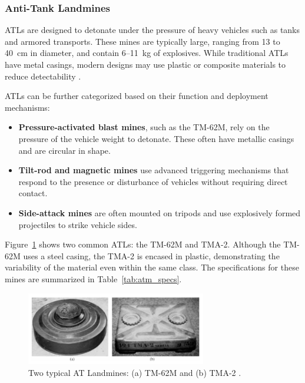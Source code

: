 \subsubsection{Anti-Tank Landmines}

ATLs are designed to detonate under the pressure of heavy vehicles such as tanks and armored transports. These mines are typically large, ranging from 13 to 40~cm in diameter, and contain 6–11~kg of explosives. While traditional ATLs have metal casings, modern designs may use plastic or composite materials to reduce detectability \cite{evans2024detection}.

ATLs can be further categorized based on their function and deployment mechanisms:
\begin{itemize}
    \item \textbf{Pressure-activated blast mines}, such as the TM-62M, rely on the pressure of the vehicle weight to detonate. These often have metallic casings and are circular in shape.
    \item \textbf{Tilt-rod and magnetic mines} use advanced triggering mechanisms that respond to the presence or disturbance of vehicles without requiring direct contact.
    \item \textbf{Side-attack mines} are often mounted on tripods and use explosively formed projectiles to strike vehicle sides.
\end{itemize}

Figure~\ref{fig:atm_examples} shows two common ATLs: the TM-62M and TMA-2. Although the TM-62M uses a steel casing, the TMA-2 is encased in plastic, demonstrating the variability of the material even within the same class. The specifications for these mines are summarized in Table~\ref{tab:atm_specs}.

\begin{figure}[h]
    \centering
    \includegraphics[width=0.7\textwidth]{figs/Huirui/atm_examples.png}
    \caption{Two typical AT Landmines: (a) TM-62M and (b) TMA-2 \cite{paik2002image}.}
    \label{fig:atm_examples}
\end{figure}

